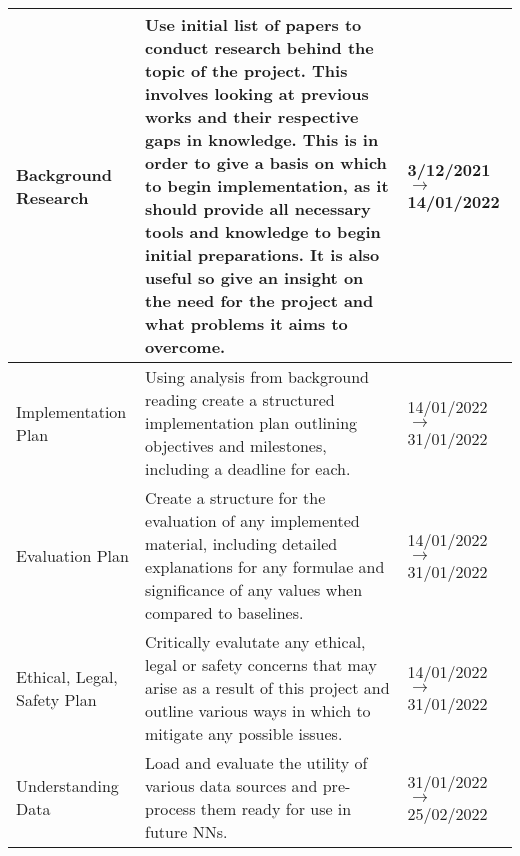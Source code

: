 \begin{longtable}{|| P{0.2\textwidth} | P{.45\textwidth} | P{.15\textwidth} ||}
    \hline
    Background Research                                  & Use initial list of papers to conduct research behind the topic of the project. This involves looking at previous works and their respective gaps in knowledge. This is in order to give a basis on which to begin implementation, as it should provide all necessary tools and knowledge to begin initial preparations. It is also useful so give an  insight on the need for the project and what problems it aims to overcome. & 3/12/2021 $ \rightarrow $ 14/01/2022      \\
    \hline
    Implementation Plan                                  & Using analysis from background reading create a structured implementation plan outlining objectives and milestones, including a deadline for each.                                                                                                                                                                                                                                                                                & 14/01/2022 $ \rightarrow $ 31/01/2022     \\
    \hline
    Evaluation Plan                                      & Create a structure for the evaluation of any implemented material, including detailed explanations for any formulae and significance of any values when compared to baselines.                                                                                                                                                                                                                                                    & 14/01/2022 $ \rightarrow $ 31/01/2022     \\
    \hline
    Ethical, Legal, Safety Plan                          & Critically evalutate any ethical, legal or safety concerns that may arise as a result of this project and outline various ways in which to mitigate any possible issues.                                                                                                                                                                                                                                                          & 14/01/2022 $ \rightarrow $ 31/01/2022     \\
    \hline
    Understanding Data                                   & Load and evaluate the utility of various data sources and pre-process them ready for use in future NNs.                                                                                                                                                                                                                                                                                                                           & 31/01/2022 $ \rightarrow $ 25/02/2022     \\

\end{longtable}
